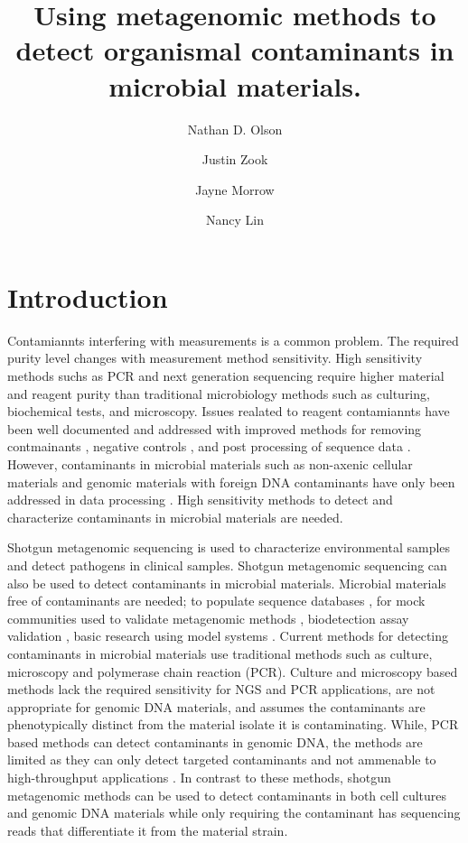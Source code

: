 \documentclass[fleqn,10pt,lineno]{wlpeerj}\usepackage[]{graphicx}\usepackage[]{color}
\title{Using metagenomic methods to detect organismal contaminants in microbial materials.}
\author[1]{Nathan D. Olson}
\author[1]{Justin Zook}
\author[1]{Jayne Morrow}
\author[1]{Nancy Lin}
\affil[1]{Material Measurement Laboratory, National Institute of Standards and Technology}
\begin{document}
\flushbottom
\maketitle
\thispagestyle{empty}

\section*{Introduction}
Contamiannts interfering with measurements is a common problem. 
The required purity level changes with measurement method sensitivity. 
High sensitivity methods suchs as PCR and next generation sequencing require higher material and reagent purity than traditional microbiology methods such as culturing, biochemical tests, and microscopy. 
Issues realated to reagent contamiannts have been well documented and addressed with improved methods for removing contmainants \citep{woyke2011decontamination,motley2014improved}, negative controls \citep{jervis2015deriving}, and post processing of sequence data \citep{mukherjee2015large}. 
However, contaminants in microbial materials such as non-axenic cellular materials \citep{Shrestha2013} and genomic materials with foreign DNA contaminants have only been addressed in data processing \citep{tennessen2015prodege}. 
High sensitivity methods to detect and characterize contaminants in microbial materials are needed.  

Shotgun metagenomic sequencing is used to characterize environmental samples and detect pathogens in clinical samples.
Shotgun metagenomic sequencing can also be used to detect contaminants in microbial materials. 
Microbial materials free of contaminants are needed; to populate sequence databases \citep{parks2015checkm}, for mock communities used to validate metagenomic methods \citep{bokulich2016mockrobiota}, biodetection assay validation \citep{Ieven2013,International2011}, basic research using model systems \citep{Shrestha2013}.
Current methods for detecting contaminants in microbial materials use traditional methods such as culture, microscopy and polymerase chain reaction (PCR). 
Culture and microscopy based methods lack the required sensitivity for NGS and PCR applications, are not appropriate for genomic DNA materials, and assumes the contaminants are phenotypically distinct from the material isolate it is contaminating. 
While, PCR based methods can detect contaminants in genomic DNA, the methods are limited as they can only detect targeted contaminants and not ammenable to high-throughput applications \citep{heck2016evaluating,Marron2013}. 
In contrast to these methods, shotgun metagenomic methods can be used to detect contaminants in both cell cultures and genomic DNA materials while only requiring the contaminant has sequencing reads that differentiate it from the material strain. 
\end{document}
